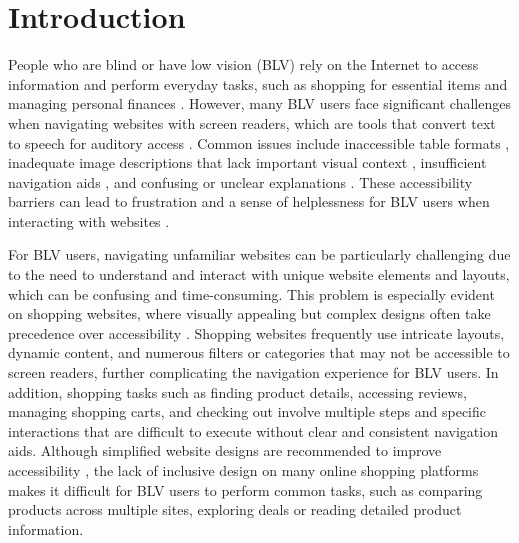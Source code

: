 \section{Introduction}

People who are blind or have low vision (BLV) rely on the Internet to access information and perform everyday tasks, such as shopping for essential items and managing personal finances \cite{10.1145/3234695.3236337}. However, many BLV users face significant challenges when navigating websites with screen readers, which are tools that convert text to speech for auditory access \cite{10.1145/2207676.2207736}. Common issues include inaccessible table formats \cite{10.1145/274497.274521}, inadequate image descriptions that lack important visual context \cite{10.1145/3173574.3174092}, insufficient navigation aids \cite{10.1145/3173574.3173585}, and confusing or unclear explanations \cite{8651676, 10.1145/3167132.3167349}. These accessibility barriers can lead to frustration and a sense of helplessness for BLV users when interacting with websites \cite{baker2005building}.

For BLV users, navigating unfamiliar websites can be particularly challenging due to the need to understand and interact with unique website elements and layouts, which can be confusing and time-consuming. This problem is especially evident on shopping websites, where visually appealing but complex designs often take precedence over accessibility \cite{haubl2000consumer}. Shopping websites frequently use intricate layouts, dynamic content, and numerous filters or categories that may not be accessible to screen readers, further complicating the navigation experience for BLV users. In addition, shopping tasks such as finding product details, accessing reviews, managing shopping carts, and checking out involve multiple steps and specific interactions that are difficult to execute without clear and consistent navigation aids. Although simplified website designs are recommended to improve accessibility \cite{10.1145/1978942.1979001}, the lack of inclusive design on many online shopping platforms makes it difficult for BLV users to perform common tasks, such as comparing products across multiple sites, exploring deals or reading detailed product information.

